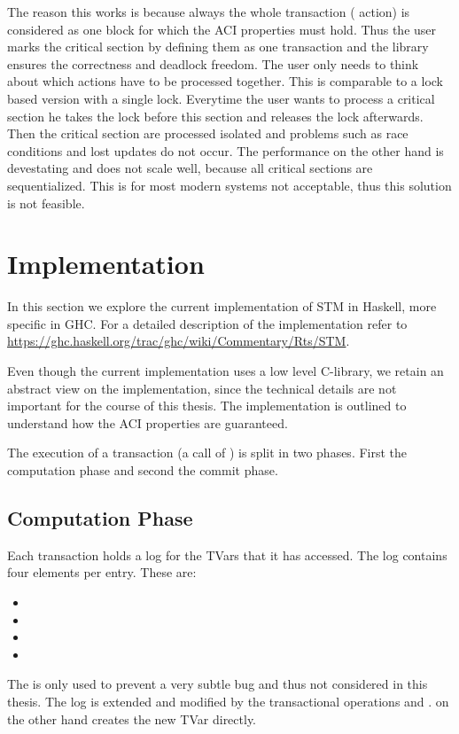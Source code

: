 The reason this works is because always the whole transaction ( action) is considered as one block for which
the ACI properties must hold. Thus the user marks the critical section by defining them as one transaction and the 
library ensures the correctness and deadlock freedom. The user only needs to think about which actions have to be 
processed together. This is comparable to a lock based version with a single lock. Everytime the user wants to process a 
critical section he takes the lock before this section and releases the lock afterwards. Then the critical section 
are processed isolated and problems such as race conditions and lost updates do not occur. The performance on the
other hand is devestating and does not scale well, because all critical sections are sequentialized. This is for
most modern systems not acceptable, thus this solution is not feasible.
  
\section{Implementation}
\label{sec:GHCImpl}
In this section we explore the current implementation of STM in Haskell, more specific in GHC. For a detailed description of the implementation 
refer to \url{https://ghc.haskell.org/trac/ghc/wiki/Commentary/Rts/STM}. 

Even though the current implementation uses a low level C-library, we retain an abstract view on the implementation, since the technical 
details are not important for the course of this thesis. The implementation is outlined to understand how the ACI 
properties are guaranteed.

The execution of a transaction (a call of ) is split in two phases. First the computation phase and second the commit phase. 
 
\subsection{Computation Phase}
Each transaction holds a log for the TVars that it has accessed. The log contains four elements per entry. These are: 
\begin{itemize}
 \item {}
 \item {}
 \item {}
 \item {}
\end{itemize}
The  is only used to prevent a very subtle bug and thus not considered in this thesis. 
The log is extended and modified by the transactional operations  and .  on 
the other hand creates the new TVar directly. 

